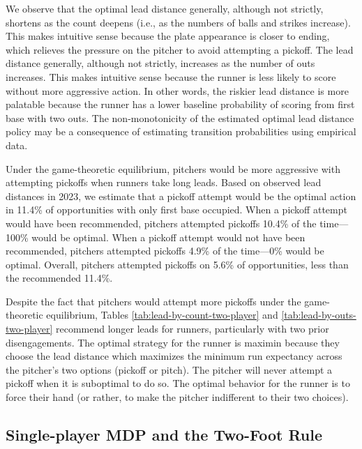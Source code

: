 \documentclass[opre,dblanonrev]{informs4}
\begin{document}
      We observe that the optimal lead distance generally, although not strictly, shortens as the count deepens (i.e., as the numbers of balls and strikes increase). This makes intuitive sense because the plate appearance is closer to ending, which relieves the pressure on the pitcher to avoid attempting a pickoff. The lead distance generally, although not strictly, increases as the number of outs increases. This makes intuitive sense because the runner is less likely to score without more aggressive action. In other words, the riskier lead distance is more palatable because the runner has a lower baseline probability of scoring from first base with two outs. The non-monotonicity of the estimated optimal lead distance policy may be a consequence of estimating transition probabilities using empirical data.

      Under the game-theoretic equilibrium, pitchers would be more aggressive with attempting pickoffs when runners take long leads. Based on observed lead distances in 2023, we estimate that a pickoff attempt would be the optimal action in 11.4\% of opportunities with only first base occupied. When a pickoff attempt would have been recommended, pitchers attempted pickoffs 10.4\% of the time---100\% would be optimal. When a pickoff attempt would not have been recommended, pitchers attempted pickoffs 4.9\% of the time---0\% would be optimal. Overall, pitchers attempted pickoffs on 5.6\% of opportunities, less than the recommended 11.4\%.
      

      Despite the fact that pitchers would attempt more pickoffs under the game-theoretic equilibrium, Tables \ref{tab:lead-by-count-two-player} and \ref{tab:lead-by-outs-two-player} recommend longer leads for runners, particularly with two prior disengagements. The optimal strategy for the runner is maximin because they choose the lead distance which maximizes the minimum run expectancy across the pitcher's two options (pickoff or pitch). The pitcher will never attempt a pickoff when it is suboptimal to do so. The optimal behavior for the runner is to force their hand (or rather, to make the pitcher indifferent to their two choices).


    \subsection{Single-player MDP and the Two-Foot Rule}
    \label{sec:two-foot-rule}
\end{document}
